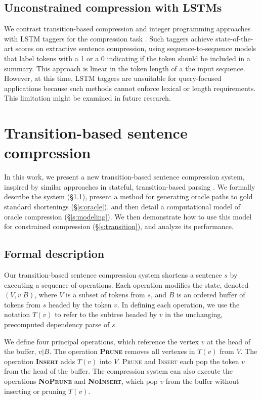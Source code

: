 \documentclass[11pt,a4paper]{article}
\begin{document}
\subsection{Unconstrained compression with LSTMs}

We contrast transition-based compression and integer programming approaches with LSTM taggers for the compression task \cite{filippova2015sentence}. Such taggers achieve state-of-the-art scores on extractive sentence compression, using sequence-to-sequence models that label tokens with a 1 or a 0 indicating if the token should be included in a summary. This approach is linear in the token length of a the input sequence. However, at this time, LSTM taggers are unsuitable for query-focused applications because such methods cannot enforce lexical or length requirements. This limitation might be examined in future research.

\section{Transition-based sentence compression}\label{s:system}

In this work, we present a new transition-based sentence compression system, inspired by similar approaches in stateful, transition-based parsing \cite{nivre2003,D14-1082}. We formally describe the system (\S\ref{s:formal}), present a method for generating oracle paths to gold standard shortenings (\S\ref{s:oracle}), and then detail a computational model of oracle compression (\S\ref{s:modeling}). We then demonstrate how to use this model for constrained compression (\S\ref{s:transition}), and analyze its performance.

\subsection{Formal description}\label{s:formal}

Our transition-based sentence compression system shortens a sentence $s$ by executing a sequence of operations. Each operation modifies the state, denoted $(V,v|B)$, where $V$ is a subset of tokens from $s$, and $B$ is an ordered buffer of tokens from $s$ headed by the token $v$. In defining each operation, we use the notation $T(v)$ to refer to the subtree headed by $v$ in the unchanging, precomputed dependency parse of $s$.

We define four principal operations, which reference the vertex $v$ at the head of the buffer, $v|B$. The operation \textbf{\textsc{Prune}} removes all vertexes in $T(v)$ from $V$. The operation \textbf{\textsc{Insert}} adds $T(v)$ into $V$. \textsc{Prune} and \textsc{Insert} each pop the token $v$ from the head of the buffer. The compression system can also execute the operations \textbf{\textsc{NoPrune}} and \textbf{\textsc{NoInsert}}, which pop $v$ from the buffer without inserting or pruning $T(v)$. 
\end{document}
